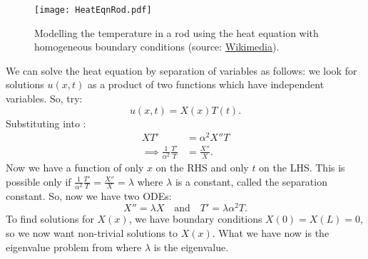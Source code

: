 \begin{figure}[!ht]
	\centering
	\texttt{[image: HeatEqnRod.pdf]}
	\caption{Modelling the temperature in a rod using the heat equation with homogeneous boundary conditions (source: \href{https://commons.wikimedia.org/wiki/File:Temp_Rod_homobc.svg}{Wikimedia}).}
	\label{fig:heateqnrod}
\end{figure}

We can solve the heat equation by separation of variables as follows: we look for solutions $u(x,t)$ as a product of two functions which have independent variables. So, try:
\begin{equation}\label{eq5.2}
	u(x,t) = X(x) T(t).
\end{equation}
Substituting  into :
\begin{align*}
	XT' &= \alpha^2 X''T \\
	\implies \frac{1}{\alpha^2} \frac{T'}{T} &= \frac{X''}{X}.
\end{align*}
Now we have a function of only $x$ on the RHS and only $t$ on the LHS. This is possible only if $\frac{1}{\alpha^2} \frac{T'}{T} = \frac{X''}{X} = \lambda$ where $\lambda$ is a constant, called the separation constant. So, now we have two ODEs:
\[
X'' = \lambda X \quad\text{and}\quad T' = \lambda \alpha^2 T.
\]
To find solutions for $X(x)$, we have boundary conditions $X(0) = X(L) = 0$, so we now want non-trivial solutions to $X(x)$. What we have now is the eigenvalue problem from  where $\lambda$ is the eigenvalue.

